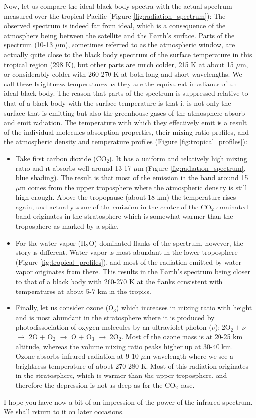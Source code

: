 \documentclass[12pt]{book}
\begin{document}
Now, let us compare the ideal black body spectra with the actual spectrum measured over the tropical Pacific (Figure \ref{fig:radiation_spectrum}): The observed spectrum is indeed far from ideal, which is a consequence of the atmosphere being between the satellite and the Earth's surface. Parts of the spectrum (10-13 $\mu$m), sometimes referred to as the atmospheric window, are actually quite close to the black body spectrum of the surface temperature in this tropical region (298 K), but other parts are much colder, 215 K at about 15 $\mu$m, or considerably colder with 260-270 K at both long and short wavelengths. We call these brightness temperatures as they are the equivalent irradiance of an ideal black body.
The reason that parts of the spectrum is suppressed relative to that of a black body with the surface temperature is that it is not only the surface that is emitting but also the greenhouse gases of the atmosphere absorb and emit radiation. The temperature with which they effectively emit is a result of the individual molecules absorption properties, their mixing ratio profiles, and the atmospheric density and temperature profiles (Figure \ref{fig:tropical_profiles}):
\begin{itemize}
\item
Take first carbon dioxide (CO$_2$). It has a uniform and relatively high mixing ratio and it absorbs well around 13-17 $\mu$m (Figure \ref{fig:radiation_spectrum}, blue shading). The result is that most of the emission in the band around 15 $\mu$m comes from the upper troposphere where the atmospheric density is still high enough. Above the tropopause (about 18 km) the temperature rises again, and actually some of the emission in the center of the CO$_2$ dominated band originates in the stratosphere which is somewhat warmer than the troposphere as marked by a spike. 
\item
For the water vapor (H$_2$O) dominated flanks of the spectrum, however, the story is different. Water vapor is most abundant in the lower troposphere (Figure \ref{fig:tropical_profiles}), and most of the radiation emitted by water vapor originates from there. This results in the Earth's spectrum being closer to that of a black body with 260-270 K at the flanks consistent with temperatures at about 5-7 km in the tropics.
\item
Finally, let us consider ozone (O$_3$) which increases in mixing ratio with height and is most abundant in the stratosphere where it is produced by photodissociation of oxygen molecules by an ultraviolet photon ($\nu$): 2O$_2 +\nu$ $\rightarrow$ 2O + O$_2$ $\rightarrow$ O + O$_3$ $\rightarrow$ 2O$_2$. Most of the ozone mass is at 20-25 km altitude, whereas the volume mixing ratio peaks higher up at 30-40 km. Ozone absorbs infrared radiation at 9-10 $\mu$m wavelength where we see a brightness temperature of about 270-280 K. Most of this radiation originates in the stratosphere, which is warmer than the upper troposphere, and therefore the depression is not as deep as for the CO$_2$ case.
\end{itemize}
I hope you have now a bit of an impression of the power of the infrared spectrum. We shall return to it on later occasions. 
\end{document}
